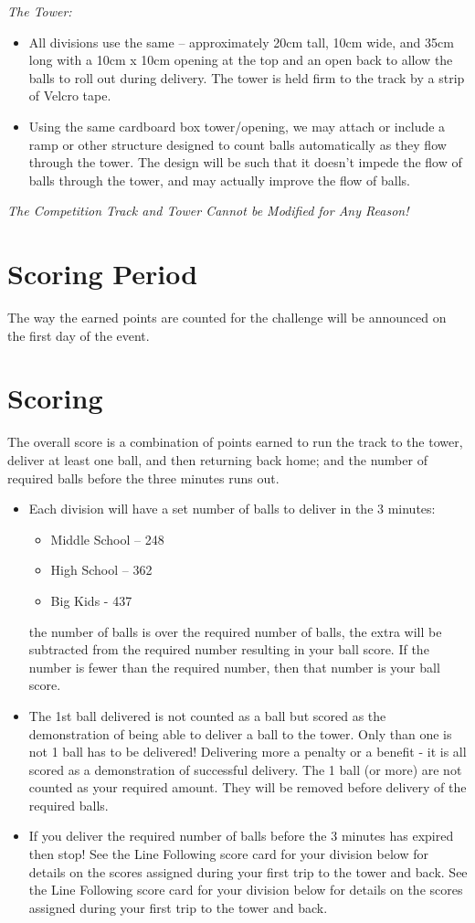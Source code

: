\documentclass[a4paper,12pt]{article}
\begin{document}
\emph{The Tower:}
\begin{itemize}
\item All divisions use the same – approximately 20cm tall, 10cm wide, and 35cm long with a 10cm x
10cm opening at the top and an open back to allow the balls to roll out during delivery. The
tower is held firm to the track by a strip of Velcro tape.
\item Using the same cardboard box tower/opening, we may attach or include a ramp or other
structure designed to count balls automatically as they flow through the tower. The design will
be such that it doesn’t impede the flow of balls through the tower, and may actually improve the
flow of balls.
\end{itemize}
\emph{The Competition Track and Tower Cannot be Modified for Any Reason!}
\section{Scoring Period}
\par The way the earned points are counted for the challenge will be announced on the first day of the event.
\section{Scoring}
The overall score is a combination of points earned to run the track to the tower, deliver at least
one ball, and then returning back home; and the number of required balls before the three
minutes runs out.
\begin{itemize}
\item Each division will have a set number of balls to deliver in the 3 minutes:
\begin{itemize}
	\item Middle School – 248
\item High School – 362
\item Big Kids - 437
\end{itemize}
\itemIf the number of balls is over
the required number of balls, the extra will be
subtracted
from the required number resulting in your ball score. If the number is fewer than the required
number, then that number is your ball score.
\item The 1st ball delivered is not counted as a ball but scored as the demonstration of being able
to deliver a ball to the tower. Only
than
one is not
1 ball
has to
be delivered! Delivering more
a penalty or a benefit - it is all scored as a demonstration of successful
delivery. The 1 ball (or more) are not counted as your required amount. They will be removed
before delivery of the required balls.
\item If you deliver the required number of balls before the 3 minutes has expired then stop!
See the Line Following score card for your division below for details on the scores assigned
during your first trip to the tower and back.
See the Line Following score card for your division below for details on the scores assigned
during your first trip to the tower and back.
\end{itemize}
\end{document}
